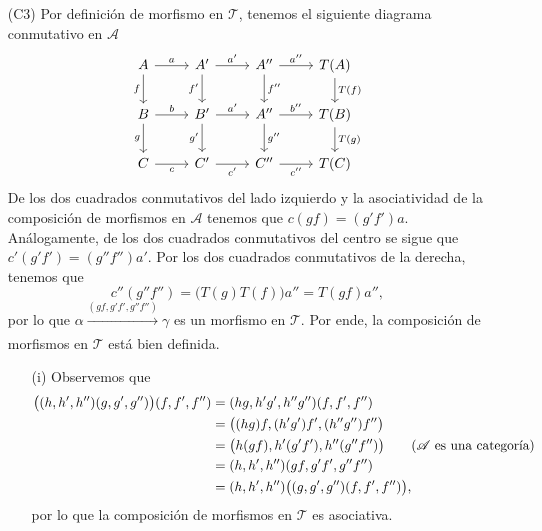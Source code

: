 \documentclass[tesis]{subfiles}
\begin{document}
\begin{Obs}
\begin{enumerate}
            \item[(C3)] Por definición de morfismo en $\mathscr{T}$, tenemos el siguiente diagrama conmutativo en $\mathscr{A}$
                \begin{equation}\label{eq: 1.(a)-1}
                    \begin{tikzcd}
                        A \arrow[]{d}[swap]{f} \arrow[]{r}[]{a} &A' \arrow[]{d}[swap]{f'} \arrow[]{r}[]{a'} &A'' \arrow[]{d}[]{f''} \arrow[]{r}[]{a''} &T(A) \arrow[]{d}[]{T(f)} \\
                        B \arrow[]{d}[swap]{g} \arrow[]{r}[]{b} &B' \arrow[]{d}[swap]{g'} \arrow[]{r}[]{a'} &A'' \arrow[]{d}[]{g''} \arrow[]{r}[]{b''} &T(B) \arrow[]{d}[]{T(g)} \\
                        C \arrow[]{r}[swap]{c} &C' \arrow[]{r}[swap]{c'} &C'' \arrow[]{r}[swap]{c''} &T(C)
                    \end{tikzcd}
                \end{equation}
                De los dos cuadrados conmutativos del lado izquierdo y la asociatividad de la composición de morfismos en $\mathscr{A}$ tenemos que $c(gf) = (g'f')a$. Análogamente, de los dos cuadrados conmutativos del centro se sigue que $c'(g'f')=(g''f'')a'$. Por los dos cuadrados conmutativos de la derecha, tenemos que
                \[
                    c''(g''f'') = \big(T(g)T(f)\big)a'' = T(gf)a'',
                \]
                por lo que $\alpha\xrightarrow[]{(gf,g'f',g''f'')}\gamma$ es un morfismo en $\mathscr{T}$. Por ende, la composición de morfismos en $\mathscr{T}$ está bien definida.
        
        \begin{enumerate}
            \item[(i)] Observemos que
            \begin{align*}
                \big( (h,h',h'')(g,g',g'') \big) (f,f',f'') &= (hg,h'g',h''g'')(f,f',f'') \\
                                                   &= \big( (hg)f, (h'g')f', (h''g'')f'' \big) \\
                                                   &= \big( h(gf), h'(g'f'), h''(g''f'') \big) \tag{$\mathscr{A}$ es una categoría} \\
                                                   &= (h,h',h'') (gf, g'f', g''f'') \\
                                                   &= (h,h',h'') \big( (g,g',g'')(f,f',f'') \big),
            \end{align*}
            por lo que la composición de morfismos en $\mathscr{T}$ es asociativa.
            

\end{enumerate}
\end{enumerate}
\end{Obs}
\end{document}
